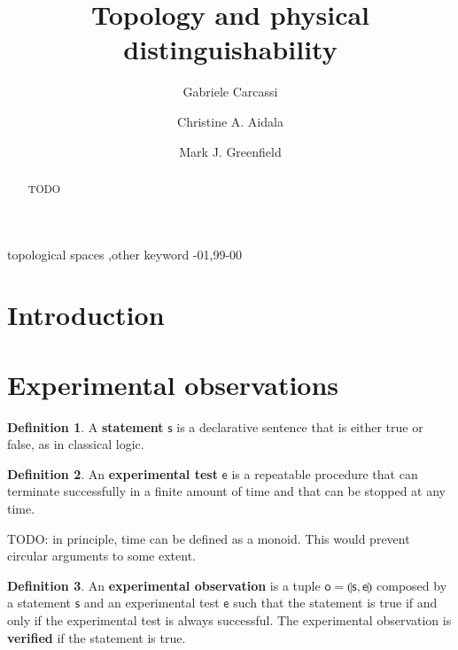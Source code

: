 \documentclass[review]{elsarticle}
\theoremstyle{plain}%
\theoremstyle{definition}
\newtheorem{defn}{Definition}[section]
\theoremstyle{remark}
\begin{document}
\begin{frontmatter}

\title{Topology and physical distinguishability}

\author[umich]{Gabriele Carcassi}

\author[umich]{Christine A. Aidala}

\author[umich]{Mark J. Greenfield}

\address[umich]{University of Michigan, Ann Arbor, MI 48109, USA}



\begin{abstract}
TODO
\end{abstract}

\begin{keyword}
topological spaces \sep other keyword
-01\sep  99-00
\end{keyword}

\end{frontmatter}

\linenumbers

\section{Introduction}

\section{Experimental observations}


\begin{defn}
	A \textbf{statement} $\mathsf{s}$ is a declarative sentence that is either true or false, as in classical logic.
\end{defn}

\begin{defn}
	An \textbf{experimental test} $\mathsf{e}$ is a repeatable procedure that can terminate successfully in a finite amount of time and that can be stopped at any time.
\end{defn}

TODO: in principle, time can be defined as a monoid. This would prevent circular arguments to some extent.

\begin{defn}
	An \textbf{experimental observation} is a tuple $\mathsf{o} = \llparenthesis \mathsf{s}, \mathsf{e} \rrparenthesis$ composed by a statement $\mathsf{s}$ and an experimental test $\mathsf{e}$ such that the statement is true if and only if the  experimental test is always successful. The experimental observation is \textbf{verified} if the statement is true.
\end{defn}
\end{document}
